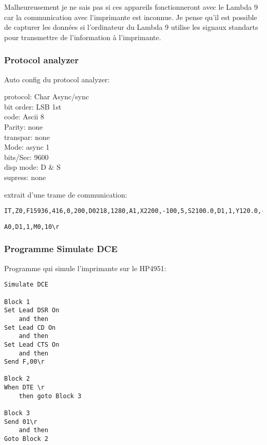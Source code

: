Malheureusement je ne sais pas si ces appareils fonctionneront avec le
Lambda 9 car la communication avec l'imprimante est inconnue. Je pense
qu'il est possible de capturer les données si l'ordinateur du Lambda 9
utilise les signaux standarts pour transmettre de l'information à
l'imprimante.

\hypertarget{protocol-analyzer}{%
\subsubsection{Protocol analyzer}\label{protocol-analyzer}}

Auto config du protocol analyzer:

protocol: Char Async/sync\\
bit order: LSB 1st\\
code: Ascii 8\\
Parity: none\\
transpar: none\\
Mode: async 1\\
bits/Sec: 9600\\
disp mode: D \& S\\
supress: none

extrait d'une trame de communication:

\begin{verbatim}
IT,Z0,F15936,416,0,200,D0218,1280,A1,X2200,-100,5,S2100.0,D1,1,Y120.0,-14.000,4,Z0,D0128,1280,L1\r\r  
\end{verbatim}

\begin{verbatim}
A0,D1,1,M0,10\r  
\end{verbatim}

\hypertarget{programme-simulate-dce}{%
\subsubsection{Programme Simulate DCE}\label{programme-simulate-dce}}

Programme qui simule l'imprimante sur le HP4951:

\begin{verbatim}
Simulate DCE  
  
Block 1  
Set Lead DSR On  
    and then  
Set Lead CD On  
    and then  
Set Lead CTS On  
    and then  
Send F,00\r  
  
Block 2  
When DTE \r  
    then goto Block 3  
  
Block 3  
Send 01\r  
    and then  
Goto Block 2  
\end{verbatim}

